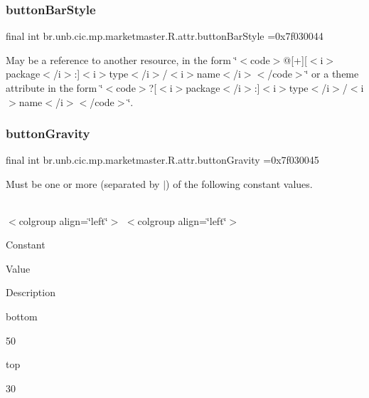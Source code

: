 \subsubsection{\texorpdfstring{button\+Bar\+Style}{buttonBarStyle}}
{\footnotesize\ttfamily final int br.\+unb.\+cic.\+mp.\+marketmaster.\+R.\+attr.\+button\+Bar\+Style =0x7f030044\hspace{0.3cm}{\ttfamily [static]}}

May be a reference to another resource, in the form \char`\"{}$<$code$>$@\mbox{[}+\mbox{]}\mbox{[}$<$i$>$package$<$/i$>$\+:\mbox{]}$<$i$>$type$<$/i$>$/$<$i$>$name$<$/i$>$$<$/code$>$\char`\"{} or a theme attribute in the form \char`\"{}$<$code$>$?\mbox{[}$<$i$>$package$<$/i$>$\+:\mbox{]}$<$i$>$type$<$/i$>$/$<$i$>$name$<$/i$>$$<$/code$>$\char`\"{}. \mbox{\label{classbr_1_1unb_1_1cic_1_1mp_1_1marketmaster_1_1R_1_1attr_a349010c89193cb66e5c0e4dc195a62e1}} 
\subsubsection{\texorpdfstring{button\+Gravity}{buttonGravity}}
{\footnotesize\ttfamily final int br.\+unb.\+cic.\+mp.\+marketmaster.\+R.\+attr.\+button\+Gravity =0x7f030045\hspace{0.3cm}{\ttfamily [static]}}

Must be one or more (separated by \textquotesingle{}$\vert$\textquotesingle{}) of the following constant values.

\tabulinesep=1mm
\begin{longtabu} spread 0pt [c]{*{0}{|X[-1]}|}
\hline
\end{longtabu}
$<$colgroup align=\char`\"{}left\char`\"{}$>$ $<$colgroup align=\char`\"{}left\char`\"{}$>$ 

Constant

Value

Description 

bottom

50

top

30\mbox{\label{classbr_1_1unb_1_1cic_1_1mp_1_1marketmaster_1_1R_1_1attr_abea9ea5c1f050d777a64ee9677f012c7}} 
